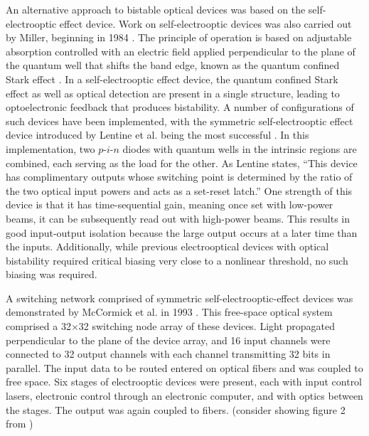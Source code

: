 An alternative approach to bistable optical devices was based on the self-electrooptic effect device. Work on self-electrooptic devices was also carried out by Miller, beginning in 1984 \cite{mich1984}. The principle of operation is based on adjustable absorption controlled with an electric field applied perpendicular to the plane of the quantum well that shifts the band edge, known as the quantum confined Stark effect \cite{mich1984b}. In a self-electrooptic effect device, the quantum confined Stark effect as well as optical detection are present in a single structure, leading to optoelectronic feedback that produces bistability. A number of configurations of such devices have been implemented, with the symmetric self-electrooptic effect device introduced by Lentine et al. being the most successful \cite{lehi1988,lehi1989}. In this implementation, two $p$-$i$-$n$ diodes with quantum wells in the intrinsic regions are combined, each serving as the load for the other. As Lentine states, ``This device has complimentary outputs whose switching point is determined by the ratio of the two optical input powers and acts as a set-reset latch.'' One strength of this device is that it has time-sequential gain, meaning once set with low-power beams, it can be subsequently read out with high-power beams. This results in good input-output isolation because the large output occurs at a later time than the inputs. Additionally, while previous electrooptical devices with optical bistability required critical biasing very close to a nonlinear threshold, no such biasing was required.

A switching network comprised of symmetric self-electrooptic-effect devices was demonstrated by McCormick et al. in 1993 \cite{mccl1993}. This free-space optical system comprised a 32$\times$32 switching node array of these devices. Light propagated perpendicular to the plane of the device array, and 16 input channels were connected to 32 output channels with each channel transmitting 32 bits in parallel. The input data to be routed entered on optical fibers and was coupled to free space. Six stages of electrooptic devices were present, each with input control lasers, electronic control through an electronic computer, and with optics between the stages. The output was again coupled to fibers. (consider showing figure 2 from \cite{mccl1993})

